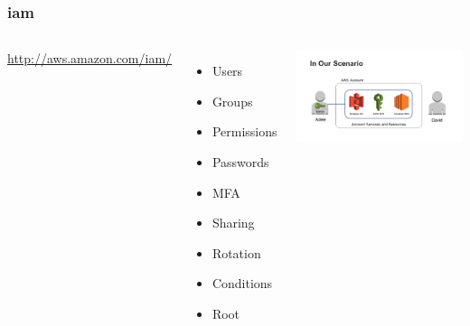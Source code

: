 \documentclass{beamer}
\begin{document}
\begin{frame}[fragile]
\frametitle{\acrfull{iam} }
\begin{columns}
\url{http://aws.amazon.com/iam/}
\begin{itemize}
 \item Users
 \item Groups
 \item Permissions
 \item Passwords
 \item MFA
 \item Sharing
 \item Rotation
 \item Conditions
 \item Root
\end{itemize}
\includegraphics[width= 1.0 \textwidth]{scenario.png}
\end{columns}
\end{frame}
\end{document}
